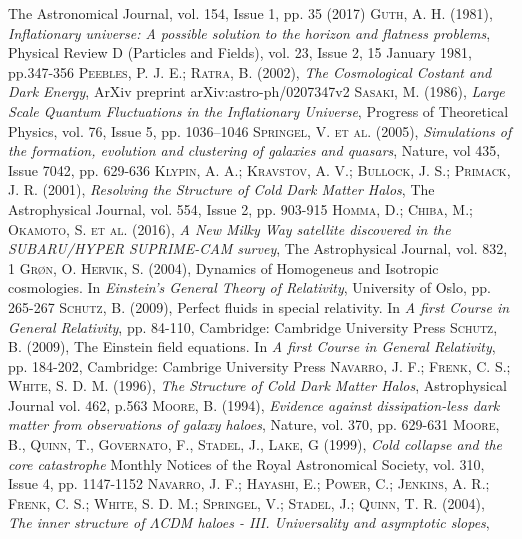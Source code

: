 \documentclass[a4paper,openright,12pt]{book}
\begin{document}
\begin{thebibliography}{a}
The Astronomical Journal, vol. 154, Issue 1, pp. 35 (2017)
 \textsc{Guth, A. H. (1981)},
\textit{Inflationary universe: A possible solution to the horizon and flatness problems},
Physical Review D (Particles and Fields), vol. 23, Issue 2, 15 January 1981, pp.347-356
 \textsc{Peebles, P. J. E.; Ratra, B. (2002)},
\textit{The Cosmological Costant and Dark Energy},
ArXiv preprint arXiv:astro-ph/0207347v2
 \textsc{Sasaki, M. (1986)},
\textit{Large Scale Quantum Fluctuations in the Inflationary Universe},
Progress of Theoretical Physics, vol. 76, Issue 5, pp. 1036–1046
 \textsc{Springel, V. et al. (2005)},
\textit{Simulations of the formation, evolution and clustering of galaxies and quasars},
Nature, vol 435, Issue 7042, pp. 629-636
 \textsc{Klypin, A. A.; Kravstov, A. V.; Bullock, J. S.; Primack, J. R. (2001)},
\textit{Resolving the Structure of Cold Dark Matter Halos},
The Astrophysical Journal, vol. 554, Issue 2, pp. 903-915
 \textsc{Homma, D.; Chiba, M.; Okamoto, S. et al. (2016)},
\textit{A New Milky Way satellite discovered in the SUBARU/HYPER SUPRIME-CAM survey},
The Astrophysical Journal, vol. 832, 1
 \textsc{ Grøn, O. Hervik, S. (2004)},
Dynamics of Homogeneus and Isotropic cosmologies. In
\textit{Einstein's General Theory of Relativity},
University of Oslo, pp. 265-267
 \textsc{Schutz, B. (2009)},
Perfect fluids in special relativity. In 
\textit{A first Course in General Relativity},
pp. 84-110, Cambridge: Cambridge University Press
 \textsc{Schutz, B. (2009)},
The Einstein field equations. In
\textit{A first Course in General Relativity},
pp. 184-202, Cambridge: Cambrige University Press
 \textsc{Navarro, J. F.; Frenk, C. S.; White, S. D. M. (1996)},
\textit{The Structure of Cold Dark Matter Halos},
Astrophysical Journal vol. 462, p.563
 \textsc{Moore, B. (1994)},
\textit{Evidence against dissipation-less dark matter from observations of galaxy haloes},
Nature, vol. 370, pp. 629-631 
 \textsc{Moore, B., Quinn, T., Governato, F., Stadel, J., Lake, G (1999)},
\textit{Cold collapse and the core catastrophe}
Monthly Notices of the Royal Astronomical Society, vol. 310, Issue 4, pp. 1147-1152
 \textsc{Navarro, J. F.; Hayashi, E.; Power, C.; Jenkins, A. R.; Frenk, C. S.; White, S. D. M.; Springel, V.; Stadel, J.; Quinn, T. R. (2004)}, 
\textit{The inner structure of $\Lambda$CDM haloes - III. Universality and asymptotic slopes}, 

\end{thebibliography}
\end{document}
